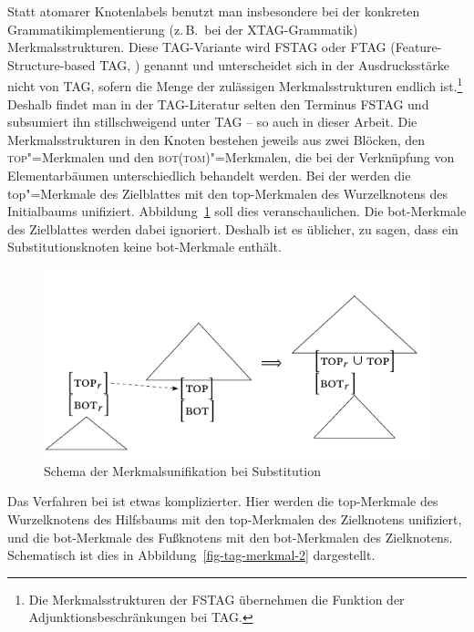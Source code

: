 Statt atomarer Knotenlabels benutzt man insbesondere bei der konkreten Grammatikimplementierung (z.\,B.\ bei der XTAG-Grammatik) Merkmalsstrukturen. Diese TAG-Variante wird \textsc{FSTAG} oder \textsc{FTAG} (Feature-Structure-based TAG, \citealt{Vijay-Shanker:Joshi:88}) genannt und unterscheidet sich in der Ausdrucksstärke nicht von TAG, sofern die Menge der zulässigen Merkmalsstrukturen endlich ist.\footnote{Die Merkmalsstrukturen der FSTAG übernehmen die Funktion der Adjunktionsbeschränkungen bei TAG.} Deshalb findet man in der TAG-Literatur selten den Terminus FSTAG und subsumiert ihn stillschweigend unter TAG -- so auch in dieser Arbeit. Die Merkmalsstrukturen in den Knoten bestehen jeweils aus zwei Blöcken, den \textsc{top}"=Merkmalen und den  \textsc{bot(tom)}"=Merkmalen, die bei der Verknüpfung von Elementarbäumen unterschiedlich behandelt werden. Bei der  werden die {\sc top}"=Merkmale des Zielblattes mit den {\sc top}-Merkmalen des Wurzelknotens des Initialbaums unifiziert. Abbildung~\ref{fig-tag-merkmal-1} soll dies veranschaulichen. Die {\sc bot}-Merkmale des Zielblattes werden dabei ignoriert. Deshalb ist es üblicher, zu sagen, dass ein Substitutionsknoten keine {\sc bot}-Merkmale enthält. 
\begin{figure}[t]
\centering
\includegraphics{graphics/abb53.pdf}
\caption{Schema der Merkmalsunifikation bei Substitution\label{fig-tag-merkmal-1}}
\end{figure}    
Das Verfahren bei  ist etwas komplizierter. Hier werden die {\sc top}-Merkmale des Wurzelknotens des Hilfsbaums mit den {\sc top}-Merkmalen des Zielknotens unifiziert, und die {\sc bot}-Merkmale des Fu\ss knotens mit den {\sc bot}-Merkmalen des Zielknotens. Schematisch ist dies in Abbildung~\ref{fig-tag-merkmal-2} dargestellt.

